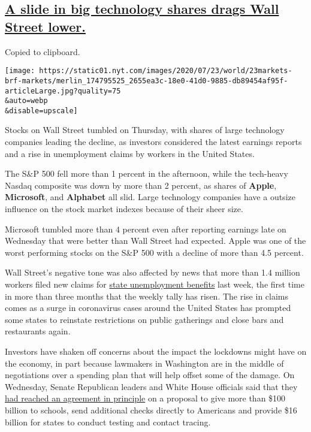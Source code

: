 \hypertarget{a-slide-in-big-technology-shares-drags-wall-street-lower}{%
\subsection{\texorpdfstring{\protect\hyperlink{a-slide-in-big-technology-shares-drags-wall-street-lower}{A
slide in big technology shares drags Wall Street
lower.}}{A slide in big technology shares drags Wall Street lower.}}\label{a-slide-in-big-technology-shares-drags-wall-street-lower}}

Copied to clipboard.

\texttt{[image: https://static01.nyt.com/images/2020/07/23/world/23markets-brf-markets/merlin\_174795525\_2655ea3c-18e0-41d0-9885-db89454af95f-articleLarge.jpg?quality=75\\\&auto=webp\\\&disable=upscale]}

Stocks on Wall Street tumbled on Thursday, with shares of large
technology companies leading the decline, as investors considered the
latest earnings reports and a rise in unemployment claims by workers in
the United States.

The S\&P 500 fell more than 1 percent in the afternoon, while the
tech-heavy Nasdaq composite was down by more than 2 percent, as shares
of \textbf{Apple}, \textbf{Microsoft}, and \textbf{Alphabet} all slid.
Large technology companies have a outsize influence on the stock market
indexes because of their sheer size.

Microsoft tumbled more than 4 percent even after reporting earnings late
on Wednesday that were better than Wall Street had expected. Apple was
one of the worst performing stocks on the S\&P 500 with a decline of
more than 4.5 percent.

Wall Street's negative tone was also affected by news that more than 1.4
million workers filed new claims for
\href{https://www.dol.gov/ui/data.pdf}{state unemployment benefits} last
week, the first time in more than three months that the weekly tally has
risen. The rise in claims comes as a surge in coronavirus cases around
the United States has prompted some states to reinstate restrictions on
public gatherings and close bars and restaurants again.

Investors have shaken off concerns about the impact the lockdowns might
have on the economy, in part because lawmakers in Washington are in the
middle of negotiations over a spending plan that will help offset some
of the damage. On Wednesday, Senate Republican leaders and White House
officials said that they
\href{https://www.nytimes.com/2020/07/22/us/politics/coronavirus-stimulus.html?action=click\&module=Top\%20Stories\&pgtype=Homepage}{had
reached an agreement in principle} on a proposal to give more than \$100
billion to schools, send additional checks directly to Americans and
provide \$16 billion for states to conduct testing and contact tracing.

